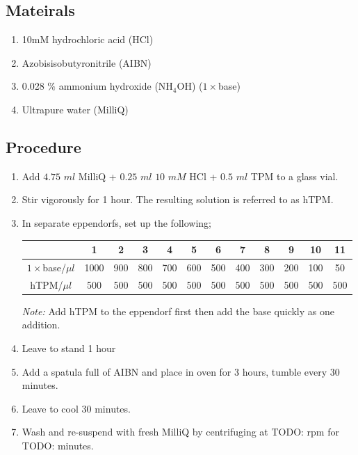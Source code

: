 \documentclass[12pt,a4paper,twoside]{article}
\begin{document}
\subsection{Mateirals}

\begin{enumerate}
    \item 10mM hydrochloric acid (HCl)
    \item Azobisisobutyronitrile (AIBN)
    \item 0.028 $\%$ ammonium hydroxide (NH$_4$OH) ($1\times$base)
    \item Ultrapure water (MilliQ)
\end{enumerate}

\subsection{Procedure}

\begin{enumerate}
    \item Add $4.75$ $ml$ MilliQ + $0.25$ $ml$ $10$ $mM$ HCl + $0.5$ $ml$ TPM to a glass vial. 
    \item Stir vigorously for 1 hour. The resulting solution is referred to as  hTPM.
    \item In separate eppendorfs, set up the following;
    
    \begin{center}    
        \begin{tabular}{ |c|c|c|c|c|c|c|c|c|c|c|c| } 
            \hline
            & 1 & 2 & 3 & 4 & 5 & 6 & 7 & 8 & 9 & 10 & 11\\
            \hline
            $1 \times$base/$\mu l$ & 1000 & 900 & 800 & 700 & 600 & 500 & 400 & 300 & 200 & 100 & 50 \\
            \hline
            hTPM/$\mu l$ & 500 & 500 & 500 & 500 & 500 & 500 & 500 & 500 & 500 & 500 & 500 \\
            \hline
        \end{tabular}
    \end{center}
    
    \textit{Note:} Add hTPM to the eppendorf first then add the base quickly as one addition.

    \item Leave to stand 1 hour 
    \item Add a spatula full of AIBN and place in oven for 3 hours, tumble every 30 minutes.
    \item Leave to cool 30 minutes.
    \item Wash and re-suspend with fresh MilliQ by centrifuging at TODO: rpm for TODO: minutes.
    
\end{enumerate}
\newpage
\end{document}
